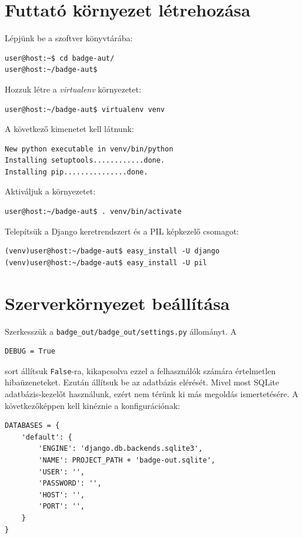 \documentclass[a4paper,10pt,titlepage]{article}
\begin{document}
\section{Futtató környezet létrehozása}

Lépjünk be a szoftver könyvtárába:

\begin{verbatim}
user@host:~$ cd badge-aut/
user@host:~/badge-aut$
\end{verbatim}

Hozzuk létre a \textit{virtualenv} környezetet:

\begin{verbatim}
user@host:~/badge-aut$ virtualenv venv
\end{verbatim}

A következő kimenetet kell látnunk:

\begin{verbatim}
New python executable in venv/bin/python
Installing setuptools............done.
Installing pip...............done.
\end{verbatim}

Aktiváljuk a környezetet:

\begin{verbatim}
user@host:~/badge-aut$ . venv/bin/activate
\end{verbatim}

Telepítsük a Django keretrendszert és a PIL képkezelő csomagot:

\begin{verbatim}
(venv)user@host:~/badge-aut$ easy_install -U django
(venv)user@host:~/badge-aut$ easy_install -U pil
\end{verbatim}

\section{Szerverkörnyezet beállítása}

Szerkesszük a \texttt{badge\_out/badge\_out/settings.py} állományt. A
\begin{verbatim}
DEBUG = True
\end{verbatim}
sort állítsuk \texttt{False}-ra, kikapcsolva ezzel a felhasználók számára értelmetlen hibaüzeneteket. Ezután állítsuk be az adatbázis elérését. Mivel most SQLite adatbázis-kezelőt használunk, ezért nem térünk ki más megoldás ismertetésére.
A következőképpen kell kinéznie a konfigurációnak:

\begin{verbatim}
DATABASES = {
    'default': {
        'ENGINE': 'django.db.backends.sqlite3',
        'NAME': PROJECT_PATH + 'badge-out.sqlite',
        'USER': '',
        'PASSWORD': '',
        'HOST': '',
        'PORT': '',
    }
}
\end{verbatim}
\end{document}
